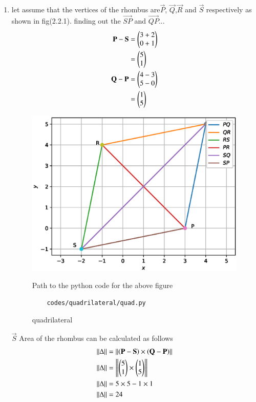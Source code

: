 \renewcommand{\theequation}{\theenumi}
\begin{enumerate}[label=\arabic*.,ref=\thesubsection.\theenumi]

\item let assume that the vertices of the rhombus are$\vec P$, $\vec Q$,$\vec R$ and $\vec S$ respectively as shown in fig(2.2.1).
finding out the $\vec{ SP}$ and $\vec {QP}$...
\begin{align}
	\mathbf {P} - \mathbf{S} &= \begin{pmatrix}3 +2\\0+1\end{pmatrix}
	\\ &= \begin{pmatrix}5\\1\end{pmatrix}
	\\
    \mathbf {Q} - \mathbf {P} &= \begin{pmatrix}4-3\\5-0\end{pmatrix}
	\\ &= \begin{pmatrix}1\\5\end{pmatrix}
\end{align}

\begin{figure}[!ht]
	\centering
	\includegraphics[width=\columnwidth]{./figures/quadrilateral/quad.eps}
	\caption{quadrilateral }
	\label{fig:quadrilateral}
	Path to the python code for the above figure
	\begin{lstlisting}
	codes/quadrilateral/quad.py
	\end{lstlisting}
\end{figure}


$\vec {S}$ Area of the rhombus can be calculated as follows 
\\
\begin{align}
	\left\lVert\Delta\right\rVert &=\left\lVert \mathbf{\left(\mathbf {P} - \mathbf {S}\right)} \times \mathbf{\left(\mathbf {Q} - \mathbf {P}\right)}\right\rVert
	\\
	\left\lVert\Delta\right\rVert &= \left\lVert \mathbf{\begin{pmatrix}5\\1\end{pmatrix}} \times \mathbf{\begin{pmatrix}1\\5\end{pmatrix}}\right\rVert
	\\
	\left\lVert\Delta\right\rVert &= 5 \times 5 - 1 \times 1
	\\
	\left\lVert\Delta\right\rVert &= 24
\end{align}

\end{enumerate}